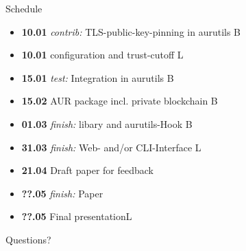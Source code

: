 \documentclass{beamer}
\begin{document}
\begin{frame}{Schedule}
	\begin{itemize}
		\item \textbf{10.01} \emph{contrib:} TLS-public-key-pinning in aurutils \hfill B
		\item \textbf{10.01} configuration and trust-cutoff \hfill L
		\item \textbf{15.01} \emph{test:} \alert{Integration in aurutils} \hfill B
		\item \textbf{15.02} \alert{AUR package} incl. private blockchain \hfill B
		\item \textbf{01.03} \emph{finish:} libary and aurutils-Hook \hfill B
		\item \textbf{31.03} \emph{finish:} Web- and/or CLI-Interface \hfill L
		\item \textbf{21.04} \alert{Draft paper} for feedback\hfill
		\item \textbf{??.05} \emph{finish:} Paper\hfill
		\item \textbf{??.05} Final presentation\hfill L
	\end{itemize}
\end{frame}

\begin{frame}[standout]
	Questions? 
\end{frame}
\end{document}
